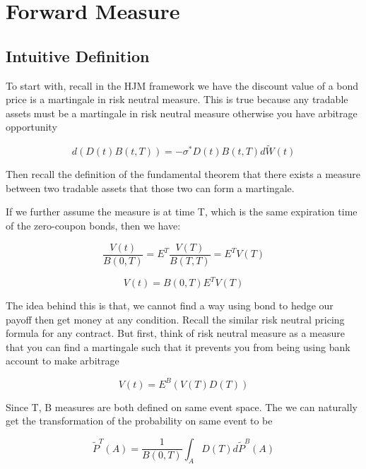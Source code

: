 \section{Forward Measure}

\subsection{Intuitive Definition}

To start with, recall in the HJM framework we have the discount value of a bond price is a martingale in risk neutral measure. This is true
because any tradable assets must be a martingale in risk neutral measure otherwise you have arbitrage opportunity

\begin{equation}
  d(D(t)B(t, T)) = -\sigma^{\ast}D(t)B(t, T)d\widetilde{W}(t)
\end{equation}

Then recall the definition of the fundamental theorem that there exists a measure between two tradable assets that those two can form a martingale.

If we further assume the measure is at time T, which is the same expiration time of the zero-coupon bonds, then we have:

\begin{equation}
  \frac{V(t)}{B(0, T)} = E^{T}\frac{V(T)}{B(T, T)} = E^{T}V(T)
\end{equation}

\begin{equation}
  V(t) = B(0, T)E^{T}V(T)
\end{equation}

The idea behind this is that, we cannot find a way using bond to hedge our payoff then get money at any condition. Recall the similar risk neutral
pricing formula for any contract. But first, think of risk neutral measure as a measure that you can find a martingale such that it prevents you from being using
bank account to make arbitrage

\begin{equation}
  V(t) = E^{B}(V(T)D(T))
\end{equation}


Since T, B measures are both defined on same event space. The we can naturally get the transformation of the probability on same event to be

\begin{equation}
  \widetilde{P}^{T}(A) = \frac{1}{B(0, T)} \int_A D(T) d\widetilde{P}^B(A)
\end{equation}


